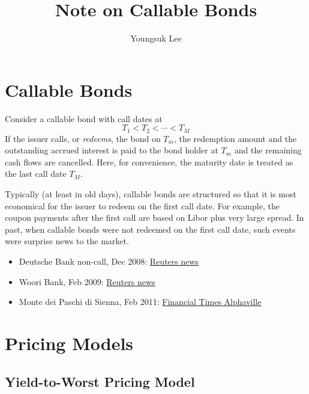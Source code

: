 \documentclass[10pt,a4paper]{article}
\begin{document}
\title{Note on Callable Bonds}
\author{Youngsuk Lee}
\maketitle

\section{Callable Bonds}

Consider a callable bond with call dates at
\begin{equation}
T_1 < T_2 < \cdots < T_M
\end{equation}
If the issuer calls, or {\em redeems}, the bond on $T_m$, the redemption amount and the outstanding accrued interest is paid to the bond holder at $T_m$ and the remaining cash flows are cancelled. Here, for convenience, the maturity date is treated as the last call date $T_M$. 


Typically (at least in old days), callable bonds are structured so that it is most economical for the issuer to redeem on the first call date. For example, the coupon payments after the first call are based on Libor plus very large spread. In past, when callable bonds were not redeemed on the first call date, such events were surprise news to the market. 
\begin{itemize}
	\item Deutsche Bank non-call, Dec 2008: \href{https://in.reuters.com/article/deutsche-bank-bond-call/update-2-deutsche-bank-non-call-casts-shadow-over-lt2-bonds-idINLH25709820081217}{Reuters news}
	\item Woori Bank, Feb 2009: \href{https://www.reuters.com/article/woori-bonds/asia-credit-woori-bank-seen-calling-back-400-mln-of-debt-idUSHKG35800620090209}{Reuters news}
	\item Monte dei Paschi di Sienna, Feb 2011:
	\href{https://ftalphaville.ft.com/2011/02/17/491236/another-bank-non-call-an-entirely-different-reaction/}{Financial Times Alphaville}
\end{itemize}

\section{Pricing Models}

\subsection{Yield-to-Worst Pricing Model}
\label{sec:pricing-model-yield-to-worst}
\end{document}
